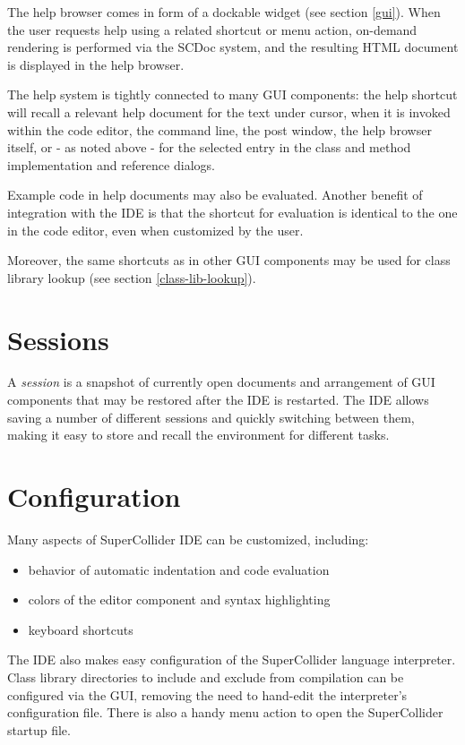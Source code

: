 \documentclass[11pt,a4paper]{article}
\begin{document}
The help browser comes in form of a dockable widget (see section \ref{gui}). When the user requests help using a related
shortcut or menu action, on-demand rendering is performed via the SCDoc system, and the resulting HTML document is
displayed in the help browser.

The help system is tightly connected to many GUI components: the help shortcut will recall a relevant help document
for the text under cursor, when it is invoked within the code editor, the command line, the post window, the help
browser itself, or - as noted above - for the selected entry in the class and method implementation and reference
dialogs.

Example code in help documents may also be evaluated. Another benefit of integration with the IDE is that the shortcut
for evaluation is identical to the one in the code editor, even when customized by the user.

Moreover, the same shortcuts as in other GUI components may be used for class library lookup (see section
\ref{class-lib-lookup}).

\section{Sessions}

A \emph{session} is a snapshot of currently open documents and arrangement of GUI components that may be restored
after the IDE is restarted. The IDE allows saving a number of different sessions and quickly switching between them,
making it easy to store and recall the environment for different tasks.

\section{Configuration}

Many aspects of SuperCollider IDE can be customized, including:
\begin{itemize}
 \item behavior of automatic indentation and code evaluation
 \item colors of the editor component and syntax highlighting
 \item keyboard shortcuts
\end{itemize}

The IDE also makes easy configuration of the SuperCollider language interpreter. Class library directories to include
and exclude from compilation can be configured via the GUI, removing the need to hand-edit the interpreter's
configuration file. There is also a handy menu action to open the SuperCollider startup file.
\end{document}
